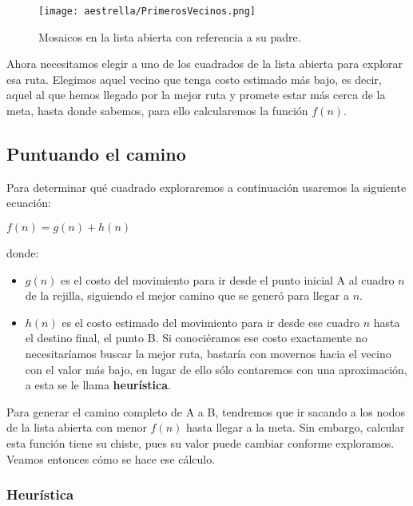 \begin{figure}[h]
  \centering
  \texttt{[image: aestrella/PrimerosVecinos.png]}
  \caption{Mosaicos en la lista abierta con referencia a su padre.}
  \label{fig:fig2P4}
\end{figure}

Ahora necesitamos elegir a uno de los cuadrados de la lista abierta para explorar esa ruta. Elegimos aquel vecino que tenga costo estimado más bajo, es decir, aquel al que hemos llegado por la mejor ruta y promete estar más cerca de la meta, hasta donde sabemos, para ello calcularemos la función $f(n)$.

\subsection{Puntuando el camino}

Para determinar qué cuadrado exploraremos a continuación usaremos la siguiente ecuación:

\begin{center}
\(f(n) = g(n) + h(n)\)
\end{center}

donde:

\begin{itemize}
  \item \(g(n)\) es el costo del movimiento para ir desde el punto inicial A al cuadro \(n\) de la rejilla, siguiendo el mejor camino que se generó para llegar a $n$.

  \item \(h(n)\) es el costo estimado del movimiento para ir desde ese cuadro \(n\) hasta el destino final, el punto B. Si conociéramos ese costo exactamente no necesitaríamos buscar la mejor ruta, bastaría con movernos hacia el vecino con el valor más bajo, en lugar de ello sólo contaremos con una aproximación, a esta se le llama \textbf{heurística}.
\end{itemize}

Para generar el camino completo de A a B, tendremos que ir sacando a los nodos de la lista abierta con menor \(f(n)\) hasta llegar a la meta.  Sin embargo, calcular esta función tiene su chiste, pues su valor puede cambiar conforme exploramos.  Veamos entonces cómo se hace ese cálculo.


\subsubsection{Heurística}

